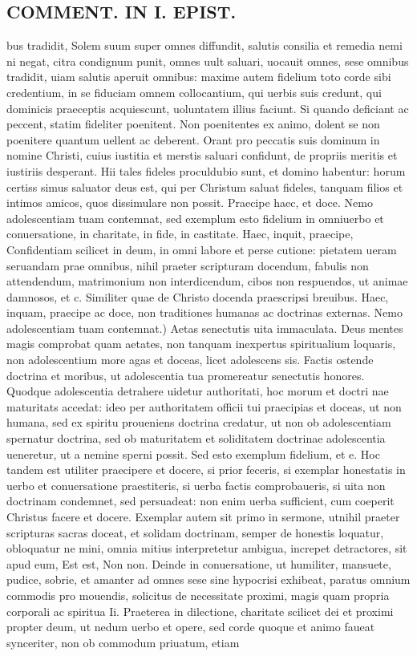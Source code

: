 \documentclass{article}
\begin{document}
\begin{pages}
\section*{COMMENT. IN I. EPIST. }
\marginpar{[ p.510 ]}\pstart bus tradidit, Solem suum super omnes diffundit, salutis consilia et remedia nemi ni negat, citra condignum punit, omnes uult saluari, uocauit omnes, sese omnibus tradidit, uiam salutis aperuit omnibus: maxime autem fidelium toto corde sibi credentium, in se fiduciam omnem collocantium, qui uerbis suis credunt, qui dominicis praeceptis acquiescunt, uoluntatem illius faciunt. Si quando deficiant ac peccent, statim fideliter poenitent. Non poenitentes ex animo, dolent se non poenitere quantum uellent ac deberent. Orant pro peccatis suis dominum in nomine Christi, cuius iustitia et merstis saluari confidunt, de propriis meritis et iustiriis desperant. Hii tales fideles proculdubio sunt, et domino habentur: horum certiss simus saluator deus est, qui per Christum saluat fideles, tanquam filios et intimos amicos, quos dissimulare non possit.  \pend\pstart Praecipe haec, et doce. Nemo adolescentiam tuam contemnat, sed exemplum esto fidelium in omniuerbo et conuersatione, in charitate, in fide, in castitate.  \pend\pstart Haec, inquit, praecipe, Confidentiam scilicet in deum, in omni labore et perse cutione: pietatem ueram seruandam prae omnibus, nihil praeter scripturam docendum, fabulis non attendendum, matrimonium non interdicendum, cibos non respuendos, ut animae damnosos, et c. Similiter quae de Christo docenda praescripsi breuibus. Haec, inquam, praecipe ac doce, non traditiones humanas ac doctrinas externas. Nemo adolescentiam tuam contemnat.) Aetas senectutis uita immaculata. Deus mentes magis comprobat quam aetates, non tanquam inexpertus spiritualium loquaris, non adolescentium more agas et doceas, licet adolescens sis. Factis ostende doctrina et moribus, ut adolescentia tua promereatur senectutis honores. Quodque adolescentia detrahere uidetur authoritati, hoc morum et doctri nae maturitats accedat: ideo per authoritatem officii tui praecipias et doceas, ut non humana, sed ex spiritu proueniens doctrina credatur, ut non ob adolescentiam spernatur doctrina, sed ob maturitatem et soliditatem doctrinae adolescentia ueneretur, ut a nemine sperni possit. Sed esto exemplum fidelium, et e. Hoc tandem est utiliter praecipere et docere, si prior feceris, si exemplar honestatis in uerbo et conuersatione praestiteris, si uerba factis comprobaueris, si uita non doctrinam condemnet, sed persuadeat: non enim uerba sufficient, cum coeperit Christus facere et docere. Exemplar autem sit primo in sermone, utnihil praeter scripturas sacras doceat, et solidam doctrinam, semper de honestis loquatur, obloquatur ne mini, omnia mitius interpretetur ambigua, increpet detractores, sit apud eum, Est est, Non non. Deinde in conuersatione, ut humiliter, mansuete, pudice, sobrie, et amanter ad omnes sese sine hypocrisi exhibeat, paratus omnium commodis pro mouendis, solicitus de necessitate proximi, magis quam propria corporali ac spiritua Ii. Praeterea in dilectione, charitate scilicet dei et proximi propter deum, ut nedum uerbo et opere, sed corde quoque et animo faueat synceriter, non ob commodum priuatum, etiam 
\end{pages}
\end{document}
